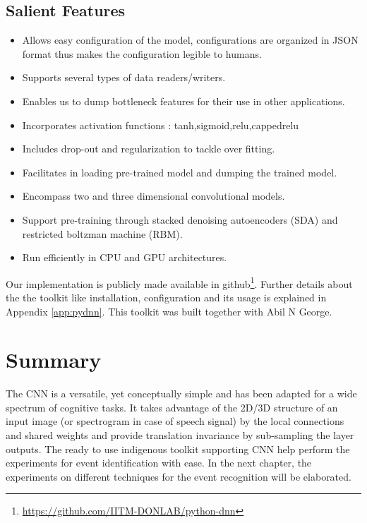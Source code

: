 \subsection{Salient Features}
\begin{itemize}
	\item Allows easy configuration of the model, configurations are organized in JSON format thus makes the configuration legible to humans.
	\item Supports several types of data readers/writers. 
	\item Enables us to dump bottleneck features for their use in other applications.
	\item Incorporates activation functions : tanh,sigmoid,relu,cappedrelu
	\item Includes drop-out and regularization to tackle over fitting.
	\item Facilitates in loading pre-trained model and dumping the trained model.
	\item Encompass two and three dimensional convolutional models.
	\item Support pre-training through stacked denoising autoencoders (SDA) and restricted boltzman machine (RBM).
	\item Run efficiently in CPU and GPU architectures.	
\end{itemize}
Our implementation is publicly made available in github\footnote{\url{https://github.com/IITM-DONLAB/python-dnn}}.  Further details about the the toolkit like installation, configuration and its usage is explained in Appendix \ref{app:pydnn}. This toolkit was built together with Abil N George.
\clearpage

\section{Summary}
The CNN is a versatile, yet conceptually simple and has been adapted for a wide spectrum of cognitive tasks.  It takes advantage of the 2D/3D structure of an input image (or spectrogram in case of speech signal) by the local connections and shared weights and provide translation invariance by sub-sampling the layer outputs.  The ready to use indigenous toolkit supporting CNN help perform the experiments for event identification with ease.  In the next chapter, the experiments on different techniques for the event recognition will be elaborated.